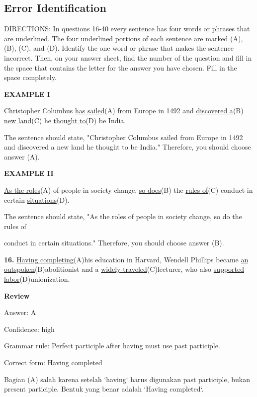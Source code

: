 \documentclass[12pt]{article}
\begin{document}
\subsection*{Error Identification}
DIRECTIONS: In questions 16-40 every sentence has four words or phrases that are underlined. The four underlined portions of each sentence are marked (A), (B), (C), and (D). Identify the one word or phrase that makes the sentence incorrect. Then, on your answer sheet, find the number of the question and fill in the space that contains the letter for the answer you have chosen. Fill in the space completely.\par
\begin{exampleblock}
\textbf{EXAMPLE I}\par
Christopher Columbus \uline{has sailed}(A) from Europe in 1492 and \uline{discovered a}(B) \uline{new land}(C) he \uline{thought to}(D) be India.\par
The sentence should state, "Christopher Columbus sailed from Europe in 1492 and discovered a new land he thought to be India." Therefore, you should choose answer (A).\par
\end{exampleblock}
\begin{exampleblock}
\textbf{EXAMPLE II}\par
\uline{As the roles}(A) of people in society change, \uline{so does}(B) the \uline{rules of}(C) conduct in certain \uline{situations}(D).\par
The sentence should state, "As the roles of people in society change, so do the rules of\par
conduct in certain situations." Therefore, you should choose answer (B).\par
\end{exampleblock}
\noindent\textbf{16.} \uline{Having completing}(A)his education in Harvard, Wendell Phillips became \uline{an outspoken}(B)abolitionist and a \uline{widely-traveled}(C)lecturer, who also \uline{supported labor}(D)unionization.
\par
\begingroup
\setlength{\parskip}{0pt}
\setlength{\parindent}{0pt}
\textbf{Review}\par
Answer: A\par
Confidence: high\par
Grammar rule: Perfect participle after having must use past participle.\par
Correct form: Having completed\par
Bagian (A) salah karena setelah `having` harus digunakan past participle, bukan present participle. Bentuk yang benar adalah `Having completed`.\par
\end{document}
